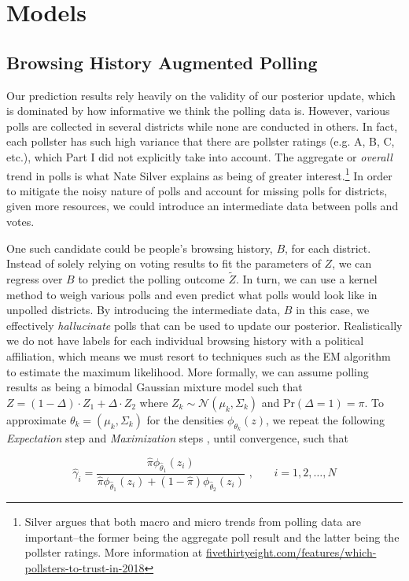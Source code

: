 \documentclass[12pt]{article}
\begin{document}
\section{Models}
\subsection{Browsing History Augmented Polling}
Our prediction results rely heavily on the validity of our posterior update, which is dominated by how informative we think the polling data is. However, various polls are collected in several districts while none are conducted in others. In fact, each pollster has such high variance that there are pollster ratings (e.g. A, B, C, etc.), which Part I did not explicitly take into account. The aggregate or \textit{overall} trend in polls is what Nate Silver explains as being of greater interest.\footnote{Silver argues that both macro and micro trends from polling data are important--the former being the aggregate poll result and the latter being the pollster ratings. More information at \url{fivethirtyeight.com/features/which-pollsters-to-trust-in-2018}} In order to mitigate the noisy nature of polls and account for missing polls for districts, given more resources, we could introduce an intermediate data between polls and votes.

One such candidate could be people's browsing history, $B$, for each district. Instead of solely relying on voting results to fit the parameters of $Z$, we can regress over $B$ to predict the polling outcome $\tilde{Z}$. In turn, we can use a kernel method to weigh various polls and even predict what polls would look like in unpolled districts. By introducing the intermediate data, $B$ in this case, we effectively \textit{hallucinate} polls that can be used to update our posterior. Realistically we do not have labels for each individual browsing history with a political affiliation, which means we must resort to techniques such as the EM algorithm to estimate the maximum likelihood. More formally, we can assume polling results as being a bimodal Gaussian mixture model such that $Z = (1 - \Delta) \cdot Z_1 + \Delta \cdot Z_2$ where $Z_k \sim \mathcal{N}(\mu_k, \Sigma_k)$ and Pr$(\Delta = 1) = \pi$. To approximate $\theta_k = (\mu_k, \Sigma_k)$ for the densities $\phi_{\theta_k}(z)$, we repeat the following \textit{Expectation} step  and \textit{Maximization} steps ,  until convergence, such that

\begin{equation}
\hat{\gamma}_i = \frac{\hat{\pi}\phi_{\hat{\theta}_1}(z_i)}{\hat{\pi}\phi_{\hat{\theta}_1}(z_i) + (1-\hat{\pi})\phi_{\hat{\theta}_2}(z_i)} \text{\ ,} \qquad i = 1,2,\ldots, N
\label{eq:expectation}
\end{equation}
\end{document}
